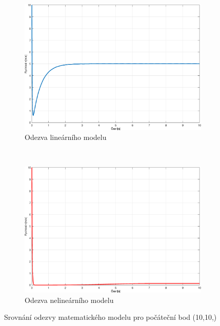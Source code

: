 \documentclass{article}
\begin{document}
\begin{enumerate}
\begin{enumerate}
                \begin{figure}[H]
                    \centering
                    \begin{subfigure}[b]{0.45\textwidth}
                        \includegraphics[width=\textwidth]{Figures/Odezva_2_4_linearni.eps}
                        \caption{Odezva lineárního modelu}
                        \label{fig:LinearFig_24cII}
                    \end{subfigure}
                    ~
                    \begin{subfigure}[b]{0.45\textwidth}
                        \includegraphics[width=\textwidth]{Figures/Odezva_2_4_nelinearni.eps}
                        \caption{Odezva nelineárního modelu}
                        \label{fig:NonlinearFig_24cII}
                    \end{subfigure}

                    \caption{Srovnání odezvy matematického modelu pro počáteční bod (10,10,)}
                    \label{fig:24cIICompare}
                \end{figure}
        
        \end{enumerate}

\end{enumerate}
\end{document}
